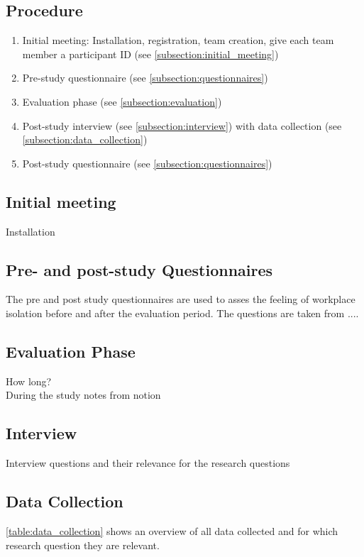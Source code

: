 \subsection{Procedure}
\begin{enumerate}
    \item Initial meeting: Installation, registration, team creation, give each team member a participant ID (see \autoref{subsection:initial_meeting})
    \item Pre-study questionnaire (see \autoref{subsection:questionnaires})
    \item Evaluation phase (see \autoref{subsection:evaluation})
    \item Post-study interview (see \autoref{subsection:interview}) with data collection (see \autoref{subsection:data_collection})
    \item  Post-study questionnaire (see \autoref{subsection:questionnaires})
\end{enumerate}

\subsection{Initial meeting}
\label{subsection:initial_meeting}
Installation

\subsection{Pre- and post-study Questionnaires}
\label{subsection:questionnaires}
The pre and post study questionnaires are used to asses the feeling of workplace isolation before and after the evaluation period. The questions are taken from ....

\subsection{Evaluation Phase}
\label{subsection:evaluation}
How long? \\
During the study notes from notion

\subsection{Interview}
\label{subsection:interview}
Interview questions and their relevance for the research questions

\subsection{Data Collection}
\label{subsection:data_collection}
\autoref{table:data_collection} shows an overview of all data collected and for which research question they are relevant.

